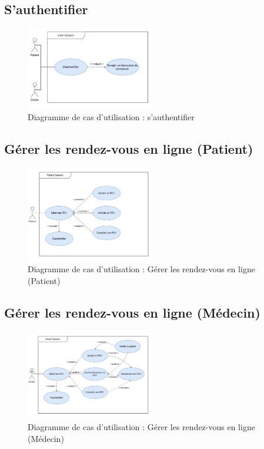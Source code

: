 \documentclass[a4paper]{report}
\begin{document}
\subsection{S'authentifier}
\begin{figure}[H]
    \vspace{-10pt}
    \centering
    \includegraphics[width=0.5\textwidth]{besoins/authentification.png}
    \caption{Diagramme de cas d'utilisation : s'authentifier}
    \label{fig:DCU2}
\end{figure}

\subsection{Gérer les rendez-vous en ligne (Patient)}
\begin{figure}[H]
    \vspace{-10pt}
    \centering
    \includegraphics[width=0.5\textwidth]{besoins/gerer-rdv-patient.png}
    \caption{Diagramme de cas d'utilisation : Gérer les rendez-vous en ligne (Patient)}
    \label{fig:DCU3}
\end{figure}

\subsection{Gérer les rendez-vous en ligne (Médecin)}
\begin{figure}[H]
    \vspace{-10pt}
    \centering
    \includegraphics[width=0.5\textwidth]{besoins/gerer-rdv-medecin.png}
    \caption{Diagramme de cas d'utilisation : Gérer les rendez-vous en ligne (Médecin)}
    \label{fig:DCU4}
\end{figure}
\end{document}
